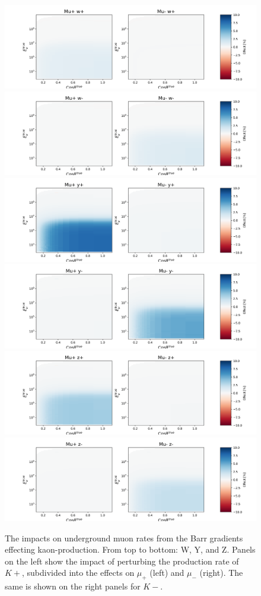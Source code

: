 \documentclass[main.tex]{subfiles}
\begin{document}
\begin{figure}
    \centering
    \includegraphics[width=0.45\linewidth]{./figures/muon/under_muon_barr_w+.png}%
    \includegraphics[width=0.45\linewidth]{./figures/muon/under_muon_barr_w-.png}
    \includegraphics[width=0.45\linewidth]{./figures/muon/under_muon_barr_y+.png}%
    \includegraphics[width=0.45\linewidth]{./figures/muon/under_muon_barr_y-.png}
    \includegraphics[width=0.45\linewidth]{./figures/muon/under_muon_barr_z+.png}%
    \includegraphics[width=0.45\linewidth]{./figures/muon/under_muon_barr_z-.png}
    \caption{The impacts on underground muon rates from the Barr gradients effecting kaon-production. From top to bottom: W, Y, and Z. Panels on the left show the impact of perturbing the production rate of $K+$, subdivided into the effects on $\mu_{+}$ (left) and $\mu_{-}$ (right). The same is shown on the right panels for $K-$.}\label{fig:under_barr_muon_kaon}
\end{figure}
\end{document}
